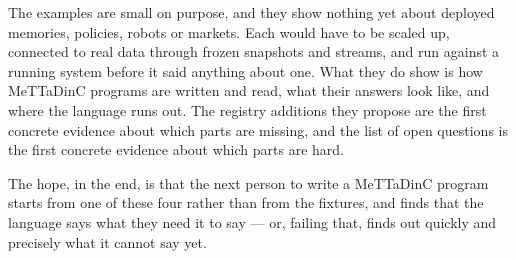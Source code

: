 \documentclass[11pt]{article}
\theoremstyle{definition}
\theoremstyle{plain}
\begin{document}
The examples are small on purpose, and they show nothing yet about deployed memories, policies, robots or
markets. Each would have to be scaled up, connected to real data through frozen snapshots and streams,
and run against a running system before it said anything about one. What they do show is how MeTTaDinC
programs are written and read, what their answers look like, and where the language runs out. The
registry additions they propose are the first concrete evidence about which parts are missing, and the
list of open questions is the first concrete evidence about which parts are hard.

The hope, in the end, is that the next person to write a MeTTaDinC program starts from one of these four
rather than from the fixtures, and finds that the language says what they need it to say --- or, failing
that, finds out quickly and precisely what it cannot say yet.
\end{document}
